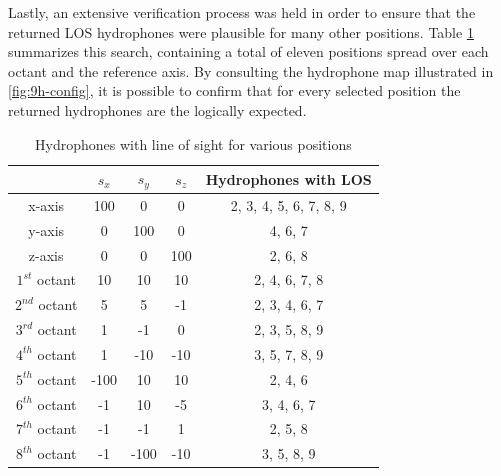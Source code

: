 Lastly, an extensive verification process was held in order to ensure that the returned LOS hydrophones were plausible for many other positions. Table \ref{tab:LOS-var-pos} summarizes this search, containing a total of eleven positions spread over each octant and the reference axis. By consulting the hydrophone map illustrated in \ref{fig:9h-config}, it is possible to confirm that for every selected position the returned hydrophones are the logically expected.

\begin{table}[!htbp] %
	\begin{center}
		\begin{tabular}{ c c c c | c }
			\toprule
			\multicolumn{1}{c|}{} & \multicolumn{1}{c}{$s_x$} & $s_y$ & $s_z$ & Hydrophones with LOS\\
			\midrule
			\multicolumn{1}{c|}{x-axis} & \multirow{1}{*}{100} & 0 & 0 & 2, 3, 4, 5, 6, 7, 8, 9 \\
			\midrule
			\multicolumn{1}{c|}{y-axis} & \multirow{1}{*}{0} & 100 & 0 & 4, 6, 7 \\
			\midrule
			\multicolumn{1}{c|}{z-axis} & \multirow{1}{*}{0} & 0 & 100 & 2, 6, 8  \\
			\midrule
			\multicolumn{1}{c|}{$1^{st}$ octant} & \multirow{1}{*}{10} & 10 & 10 & 2, 4, 6, 7, 8 \\
			\midrule
			\multicolumn{1}{c|}{$2^{nd}$ octant} & \multirow{1}{*}{5} & 5 & -1 & 2, 3, 4, 6, 7 \\
			\midrule
			\multicolumn{1}{c|}{$3^{rd}$ octant} & \multirow{1}{*}{1} & -1 & 0 & 2, 3, 5, 8, 9  \\
			\midrule
			\multicolumn{1}{c|}{$4^{th}$ octant} & \multirow{1}{*}{1} & -10 & -10 & 3, 5, 7, 8, 9 \\
			\midrule
			\multicolumn{1}{c|}{$5^{th}$ octant} & \multirow{1}{*}{-100} & 10 & 10 & 2, 4, 6  \\
			\midrule
			\multicolumn{1}{c|}{$6^{th}$ octant} & \multirow{1}{*}{-1 } & 10 & -5 & 3, 4, 6, 7  \\
			\midrule
			\multicolumn{1}{c|}{$7^{th}$ octant} & \multirow{1}{*}{-1} & -1 & 1 & 2, 5, 8 \\
			\midrule
			\multicolumn{1}{c|}{$8^{th}$ octant} & \multirow{1}{*}{-1} & -100 & -10 & 3, 5, 8, 9 \\
			\bottomrule 
		\end{tabular}
		\caption{Hydrophones with line of sight for various positions}
		\label{tab:LOS-var-pos}
	\end{center}
\end{table}
	
